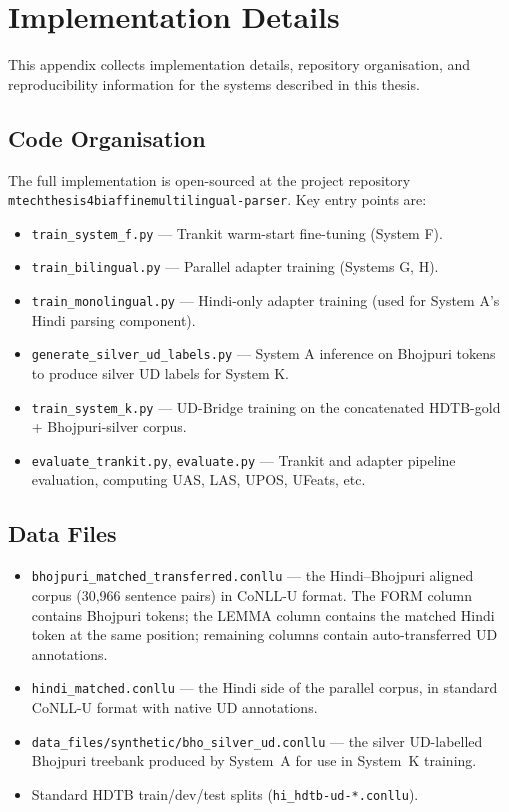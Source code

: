 \documentclass[12pt,a4paper,oneside]{report}
\begin{document}
\chapter{Implementation Details}
\label{app:impl}

This appendix collects implementation details, repository organisation, and
reproducibility information for the systems described in this thesis.

\section{Code Organisation}

The full implementation is open-sourced at the project repository
\texttt{mtechthesis4biaffinemultilingual-parser}. Key entry points are:

\begin{itemize}
  \item \texttt{train\_system\_f.py} --- Trankit warm-start fine-tuning (System F).
  \item \texttt{train\_bilingual.py} --- Parallel adapter training (Systems G, H).
  \item \texttt{train\_monolingual.py} --- Hindi-only adapter training (used for
        System A's Hindi parsing component).
  \item \texttt{generate\_silver\_ud\_labels.py} --- System A inference on
        Bhojpuri tokens to produce silver UD labels for System K.
  \item \texttt{train\_system\_k.py} --- UD-Bridge training on the concatenated
        HDTB-gold + Bhojpuri-silver corpus.
  \item \texttt{evaluate\_trankit.py}, \texttt{evaluate.py} --- Trankit and
        adapter pipeline evaluation, computing UAS, LAS, UPOS, UFeats, etc.
\end{itemize}

\section{Data Files}

\begin{itemize}
  \item \texttt{bhojpuri\_matched\_transferred.conllu} --- the
        Hindi--Bhojpuri aligned corpus (30,966 sentence pairs) in CoNLL-U
        format. The FORM column contains Bhojpuri tokens; the LEMMA column
        contains the matched Hindi token at the same position; remaining
        columns contain auto-transferred UD annotations.
  \item \texttt{hindi\_matched.conllu} --- the Hindi side of the parallel
        corpus, in standard CoNLL-U format with native UD annotations.
  \item \texttt{data\_files/synthetic/bho\_silver\_ud.conllu} --- the silver
        UD-labelled Bhojpuri treebank produced by System~A for use in
        System~K training.
  \item Standard HDTB train/dev/test splits (\texttt{hi\_hdtb-ud-*.conllu}).
\end{itemize}
\end{document}
